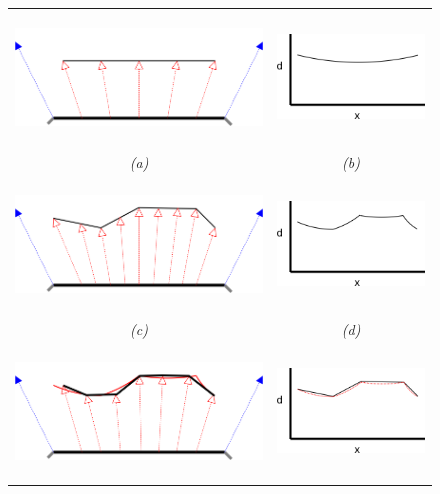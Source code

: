 \begin{figure}
\begin{center}
\begin{tabular}{cc}
\includegraphics[height=3.5cm]{../images/approx_a} &
\includegraphics[height=3cm]{../images/approx_b} \\
{\it (a)} & {\it (b)} \\
\includegraphics[height=3.5cm]{../images/approx_c} &
\includegraphics[height=3cm]{../images/approx_d} \\
{\it (c)} & {\it (d)} \\
\includegraphics[height=3.5cm]{../images/approx_e} &
\includegraphics[height=3cm]{../images/approx_f} \\

\end{tabular}
\end{center}
\end{figure}
